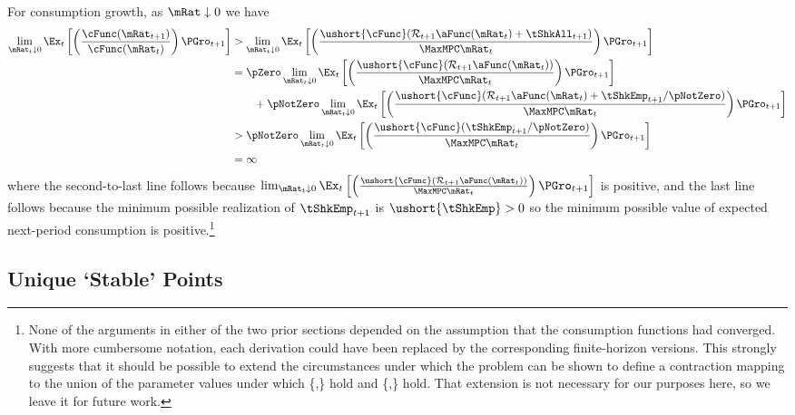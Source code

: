 \documentclass[BufferStockTheory]{subfiles}
\begin{document}
For consumption growth, as $\mRat \downarrow 0$ we have
\begin{align*}
  \lim_{\mRat_{t} \downarrow 0} \Ex_{t}\left[\left(\frac{\cFunc({\mRat}_{t+1})}{\cFunc(\mRat_t)}\right){\PGro}_{t+1}\right]
  & > \lim_{\mRat_{t} \downarrow 0} \Ex_{t}\left[\left(\frac{\ushort{\cFunc}({\mathcal{\mathcal{R}}}_{t+1}\aFunc(\mRat_{t})+{%
    \tShkAll}_{t+1})}{\MaxMPC \mRat_{t}}\right){\PGro}_{t+1}\right]  \notag \\
  & = \pZero \lim_{\mRat_{t} \downarrow 0} \Ex_{t}\left[\left(\frac{\ushort{\cFunc}({\mathcal{\mathcal{R}}}_{t+1}\aFunc(\mRat_{t}))}{\MaxMPC \mRat_{t}}\right){\PGro}_{t+1}\right] \\
  & ~~~~~~ + \pNotZero \lim_{\mRat_{t} \downarrow 0}  \Ex_{t}\left[\left(\frac{\ushort{\cFunc}({\mathcal{\mathcal{R}}}_{t+1}\aFunc(\mRat_{t})+
    \tShkEmp_{t+1}/\pNotZero)}{\MaxMPC \mRat_{t}}\right){\PGro}_{t+1}\right]  \\\notag
  & > \pNotZero \lim_{\mRat_{t} \downarrow 0} \Ex_{t}\left[\left(\frac{\ushort{\cFunc}(
    \tShkEmp_{t+1}/\pNotZero)}{\MaxMPC \mRat_{t}}\right){\PGro}_{t+1}\right] \\
  & = \infty \nonumber
\end{align*}
where the second-to-last line follows because  $\lim_{\mRat_{t} \downarrow 0} \Ex_{t}\left[\left(\frac{\ushort{\cFunc}({\mathcal{\mathcal{R}}}_{t+1}\aFunc(\mRat_{t}))}{\MaxMPC \mRat_{t}}\right){\PGro}_{t+1}\right]$ is positive, and the last line follows because the minimum possible realization of $\tShkEmp_{t+1}$ is $\ushort{\tShkEmp}>0$ so the minimum possible value of expected next-period consumption is positive.\footnote{None of the arguments in either of the two prior sections depended on the assumption that the consumption functions had converged.  With more cumbersome notation, each derivation could have been replaced by the corresponding finite-horizon versions.  This strongly suggests that it should be possible to extend the circumstances under which the problem can be shown to define a contraction mapping to the union of the parameter values under which \{\RIC,\FHWC\} hold and \{\FVAC,\WRIC\} hold.  That extension is not necessary for our purposes here, so we leave it for future work.}

\hypertarget{onetarget}{}
\hypertarget{Unique-Stable-Points}{}

\subsection{Unique `Stable' Points}\label{subsec:onetarget}\hypertarget{TheoremTarget}{}
\end{document}
